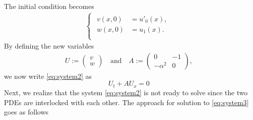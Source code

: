 \documentclass[12pt]{article}
\begin{document}
The initial condition becomes
\begin{align}
	\begin{cases}
		\begin{aligned}
			v(x,0) & = u'_{0}(x), \\
			w(x,0) & = u_{1}(x).  \\
		\end{aligned}
	\end{cases}
\end{align}
By defining the new variables
\begin{align}
	U := \begin{pmatrix} v\\w\end{pmatrix}
	\quad\text{and}\quad
	A := \begin{pmatrix} 0 &-1\\-\alpha^2 &0 \end{pmatrix},
\end{align}
we now write \eqref{eq:system2} as 
\begin{equation}\label{eq:system3}
	U_{t} + AU_{x} = 0
\end{equation}
Next, we realize that the system \eqref{eq:system2} is not ready to solve since the two PDEs are 
interlocked with each other. The approach for solution to \eqref{eq:system3} goes as follows
\end{document}
